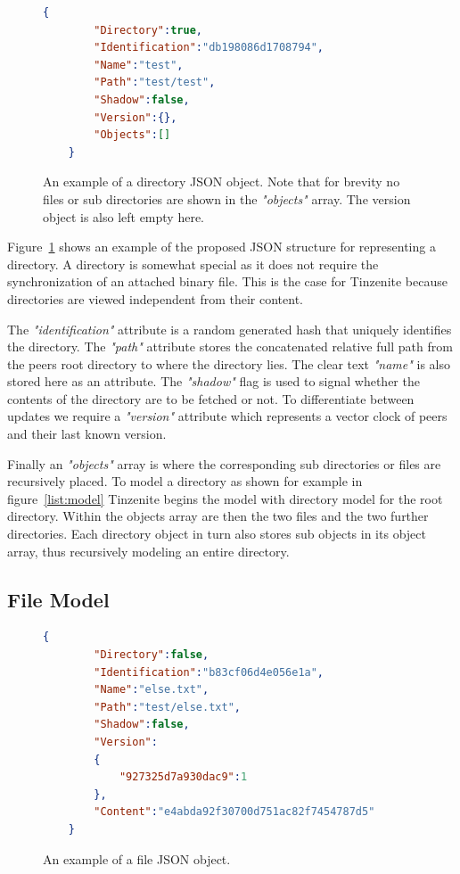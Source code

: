 \begin{figure}[htp]
    \begin{lstlisting}[language=json,firstnumber=0]
    {
        "Directory":true,
        "Identification":"db198086d1708794",
        "Name":"test",
        "Path":"test/test",
        "Shadow":false,
        "Version":{},
        "Objects":[]
    }
    \end{lstlisting}
\caption[Directory JSON Model]{An example of a directory JSON object. Note that for brevity no files or sub directories are shown in the \textit{"objects"} array. The version object is also left empty here.}
\label{json:directory_model}
\end{figure}

Figure~\ref{json:directory_model} shows an example of the proposed JSON structure for representing a directory.
A directory is somewhat special as it does not require the synchronization of an attached binary file.
This is the case for Tinzenite because directories are viewed independent from their content.

The \textit{"identification"} attribute is a random generated hash that uniquely identifies the directory.
The \textit{"path"} attribute stores the concatenated relative full path from the peers root directory to where the directory lies.
The clear text \textit{"name"} is also stored here as an attribute.
The \textit{"shadow"} flag is used to signal whether the contents of the directory are to be fetched or not.
To differentiate between updates we require a \textit{"version"} attribute which represents a vector clock of peers and their last known version.

Finally an \textit{"objects"} array is where the corresponding sub directories or files are recursively placed.
To model a directory as shown for example in figure~\ref{list:model} Tinzenite begins the model with directory model for the root directory.
Within the objects array are then the two files and the two further directories.
Each directory object in turn also stores sub objects in its object array, thus recursively modeling an entire directory.

\subsection{File Model}
\label{sec:file_model}

\begin{figure}[htp]
    \begin{lstlisting}[language=json,firstnumber=0]
    {
        "Directory":false,
        "Identification":"b83cf06d4e056e1a",
        "Name":"else.txt",
        "Path":"test/else.txt",
        "Shadow":false,
        "Version":
        {
            "927325d7a930dac9":1
        },
        "Content":"e4abda92f30700d751ac82f7454787d5"
    }
    \end{lstlisting}
\caption[File JSON Model]{An example of a file JSON object.}
\label{json:file_model}
\end{figure}

